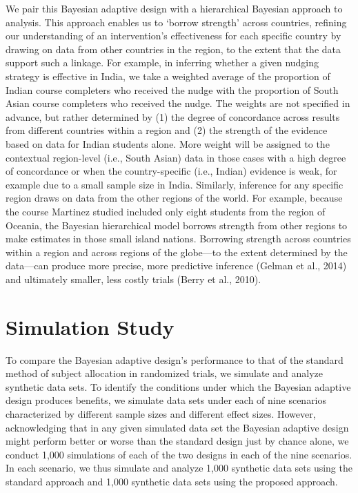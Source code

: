 \documentclass{acm_proc_article-sp}
\begin{document}
We pair this Bayesian adaptive design with a hierarchical Bayesian approach to analysis. This approach enables us to ‘borrow strength’ across countries, refining our understanding of an intervention’s effectiveness for each specific country by drawing on data from other countries in the region, to the extent that the data support such a linkage. For example, in inferring whether a given nudging strategy is effective in India, we take a weighted average of the proportion of Indian course completers who received the nudge with the proportion of South Asian course completers who received the nudge. The weights are not specified in advance, but rather determined by (1) the degree of concordance across results from different countries within a region and (2) the strength of the evidence based on data for Indian students alone. More weight will be assigned to the contextual region-level (i.e., South Asian) data in those cases with a high degree of concordance or when the country-specific (i.e., Indian) evidence is weak, for example due to a small sample size in India. Similarly, inference for any specific region draws on data from the other regions of the world. For example, because the course Martinez studied included only eight students from the region of Oceania, the Bayesian hierarchical model borrows strength from other regions to make estimates in those small island nations. Borrowing strength across countries within a region and across regions of the globe—to the extent determined by the data—can produce more precise, more predictive inference (Gelman et al., 2014) and ultimately smaller, less costly trials (Berry et al., 2010).

\section{Simulation Study}
To compare the Bayesian adaptive design’s performance to that of the standard method of subject allocation in randomized trials, we simulate and analyze synthetic data sets. To identify the conditions under which the Bayesian adaptive design produces benefits, we simulate data sets under each of nine scenarios characterized by different sample sizes and different effect sizes. However, acknowledging that in any given simulated data set the Bayesian adaptive design might perform better or worse than the standard design just by chance alone, we conduct 1,000 simulations of each of the two designs in each of the nine scenarios. In each scenario, we thus simulate and analyze 1,000 synthetic data sets using the standard approach and 1,000 synthetic data sets using the proposed approach.
\end{document}
